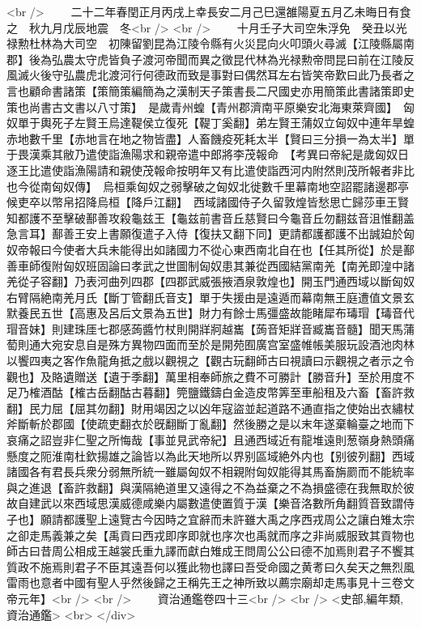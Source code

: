 <br />
　　二十二年春閏正月丙戌上幸長安二月己巳還雒陽夏五月乙未晦日有食之　秋九月戊辰地震　冬<br />
<br />
　　十月壬子大司空朱浮免　癸丑以光禄勲杜林為大司空　初陳留劉昆為江陵令縣有火災昆向火叩頭火尋滅【江陵縣屬南郡】後為弘農太守虎皆負子渡河帝聞而異之徵昆代林為光禄勲帝問昆曰前在江陵反風滅火後守弘農虎北渡河行何德政而致是事對曰偶然耳左右皆笑帝歎曰此乃長者之言也顧命書諸策【策簡策編簡為之漢制天子策書長二尺國史亦用簡策此書諸策即史策也尚書古文書以八寸策】　是歲青州蝗【青州郡濟南平原樂安北海東萊齊國】　匈奴單于輿死子左賢王烏達鞮侯立復死【鞮丁奚翻】弟左賢王蒲奴立匈奴中連年旱蝗赤地數千里【赤地言在地之物皆盡】人畜饑疫死耗太半【賢曰三分損一為太半】單于畏漢乘其敝乃遣使詣漁陽求和親帝遣中郎將李茂報命　【考異曰帝紀是歲匈奴日逐王比遣使詣漁陽請和親使茂報命按明年又有比遣使詣西河内附然則茂所報者非比也今從南匈奴傳】　烏桓乘匈奴之弱擊破之匈奴北徙數千里幕南地空詔罷諸邊郡亭候吏卒以幣帛招降烏桓【降戶江翻】　西域諸國侍子久留敦煌皆愁思亡歸莎車王賢知都護不至擊破鄯善攻殺龜兹王【龜兹前書音丘慈賢曰今龜音丘勿翻兹音沮惟翻盖急言耳】鄯善王安上書願復遣子入侍【復扶又翻下同】更請都護都護不出誠廹於匈奴帝報曰今使者大兵未能得出如諸國力不從心東西南北自在也【任其所從】於是鄯善車師復附匈奴班固論曰孝武之世圖制匈奴患其兼從西國結黨南羌【南羌即湟中諸羌從子容翻】乃表河曲列四郡【四郡武威張掖酒泉敦煌也】開玉門通西域以斷匈奴右臂隔絶南羌月氏【斷丁管翻氏音支】單于失援由是遠遁而幕南無王庭遭值文景玄默養民五世【高惠及呂后文景為五世】財力有餘士馬彊盛故能睹犀布瑇瑁【瑇音代瑁音妹】則建珠厓七郡感蒟醬竹杖則開牂牁越巂【蒟音矩牂音臧巂音髓】聞天馬蒲萄則通大宛安息自是殊方異物四面而至於是開苑囿廣宫室盛帷帳美服玩設酒池肉林以饗四夷之客作魚龍角抵之戲以觀視之【觀古玩翻師古曰視讀曰示觀視之者示之令觀也】及賂遺贈送【遺于季翻】萬里相奉師旅之費不可勝計【勝音升】至於用度不足乃榷酒酤【榷古岳翻酤古暮翻】筦鹽鐵鑄白金造皮幣筭至車船租及六畜【畜許救翻】民力屈【屈其勿翻】財用竭因之以凶年寇盜並起道路不通直指之使始出衣繡杖斧斷斬於郡國【使疏吏翻衣於旣翻斷丁亂翻】然後勝之是以末年遂棄輪臺之地而下哀痛之詔豈非仁聖之所悔哉【事並見武帝紀】且通西域近有龍堆遠則葱嶺身熱頭痛懸度之阨淮南杜欽揚雄之論皆以為此天地所以界别區域絶外内也【别彼列翻】西域諸國各有君長兵衆分弱無所統一雖屬匈奴不相親附匈奴能得其馬畜旃罽而不能統率與之進退【畜許救翻】與漢隔絶道里又遠得之不為益棄之不為損盛德在我無取於彼故自建武以來西域思漢威德咸樂内屬數遣使置質于漢【樂音洛數所角翻質音致謂侍子也】願請都護聖上遠覽古今因時之宜辭而未許雖大禹之序西戎周公之讓白雉太宗之卻走馬義兼之矣【禹貢曰西戎即序即就也序次也禹就而序之非尚威服致其貢物也師古曰昔周公相成王越裳氏重九譯而獻白雉成王問周公公曰德不加焉則君子不饗其質政不施焉則君子不臣其遠吾何以獲此物也譯曰吾受命國之黄耉曰久矣天之無烈風雷雨也意者中國有聖人乎然後歸之王稱先王之神所致以薦宗廟却走馬事見十三卷文帝元年】<br />
<br />
　　資治通鑑卷四十三<br />
<br />
<史部,編年類,資治通鑑>  <br>
   </div> 

